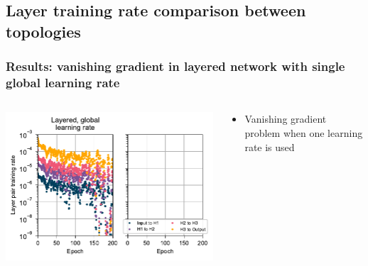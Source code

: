 \documentclass[pdf]{beamer}
\begin{document}
\subsection{Layer training rate comparison between topologies}
\begin{frame}
	\frametitle{Results: vanishing gradient in layered network with single global learning rate}
	\begin{columns}
	\begin{column}{.6\textwidth}
		\includegraphics[width=\textwidth]{figures/perlayer_global.pdf}
	\end{column}
	\begin{column}{.4\textwidth}
		\begin{itemize}
			\item Vanishing gradient problem when one learning rate is used
		\end{itemize}
	\end{column}
	\end{columns}
\end{frame}
\end{document}

